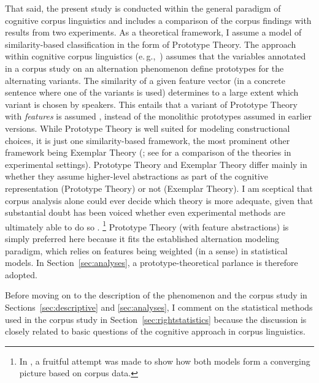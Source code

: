 \documentclass[USenglish]{article}
\newcommand{\eg}{e.\,g.,}
\begin{document}
That said, the present study is conducted within the general paradigm of cognitive corpus linguistics and includes a comparison of the corpus findings with results from two experiments.
As a theoretical framework, I assume a model of similarity-based classification in the form of Prototype Theory.
The approach within cognitive corpus linguistics (\eg\ \citealp{DivjakArppe2013,Gries2003}) assumes that the variables annotated in a corpus study on an alternation phenomenon define prototypes for the alternating variants.
The similarity of a given feature vector (in a concrete sentence where one of the variants is used) determines to a large extent which variant is chosen by speakers.
This entails that a variant of Prototype Theory with \textit{features} is assumed \citep{Rosch1978}, instead of the monolithic prototypes assumed in earlier versions.
While Prototype Theory is well suited for modeling constructional choices, it is just one similarity-based framework, the most prominent other framework being Exemplar Theory (\citealp{MedinSchaffer1978,Hintzman1986}; see \citealp{StormsEa2000} for a comparison of the theories in experimental settings).
Prototype Theory and Exemplar Theory differ mainly in whether they assume higher-level abstractions as part of the cognitive representation (Prototype Theory) or not (Exemplar Theory).
I am sceptical that corpus analysis alone could ever decide which theory is more adequate, given that substantial doubt has been voiced whether even experimental methods are ultimately able to do so \citep{Barsalou1990}.%
\footnote{In \cite{DivjakArppe2013}, a fruitful attempt was made to show how both models form a converging picture based on corpus data.}
Prototype Theory (with feature abstractions) is simply preferred here because it fits the established alternation modeling paradigm, which relies on features being weighted (in a sense) in statistical models.
In Section~\ref{sec:analyses}, a prototype-theoretical parlance is therefore adopted.

Before moving on to the description of the phenomenon and the corpus study in Sections~\ref{sec:descriptive} and \ref{sec:analyses}, I comment on the statistical methods used in the corpus study in Section~\ref{sec:rightstatistics} because the discussion is closely related to basic questions of the cognitive approach in corpus linguistics.


\end{document}
